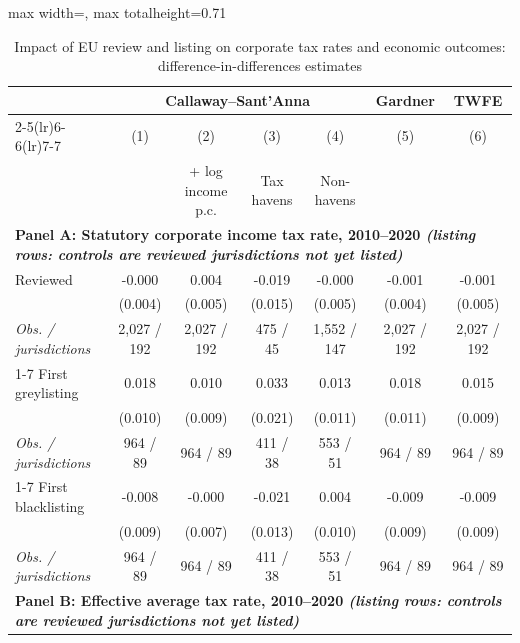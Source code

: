 \begin{table}[p]
\centering
\caption{Impact of EU review and listing on corporate tax rates and economic outcomes: difference-in-differences estimates\label{t:didextended}}
{\scriptsize\setlength{\heavyrulewidth}{1.5pt}\setlength{\lightrulewidth}{1pt}\setlength{\cmidrulewidth}{0.5pt}%
\renewcommand{\arraystretch}{1.1}%
\begin{adjustbox}{max width=\textwidth, max totalheight=0.71\textheight}
\begin{tabular}{l*{6}{c}}
\toprule
 & \multicolumn{4}{c}{Callaway--Sant'Anna} & Gardner & TWFE \\
\cmidrule(lr){2-5}\cmidrule(lr){6-6}\cmidrule(lr){7-7}
 & (1) & (2) & (3) & (4) & (5) & (6) \\
 & & + log income p.c. & Tax havens & Non-havens & & \\
\midrule
\multicolumn{7}{l}{\textbf{Panel A: Statutory corporate income tax rate, 2010--2020 \normalfont\emph{(listing rows: controls are reviewed jurisdictions not yet listed)}}} \\[2pt]
Reviewed & -0.000 & 0.004 & -0.019 & -0.000 & -0.001 & -0.001 \\
 & (0.004) & (0.005) & (0.015) & (0.005) & (0.004) & (0.005) \\
\hspace{1em}\textit{Obs. / jurisdictions} & 2,027 / 192 & 2,027 / 192 & 475 / 45 & 1,552 / 147 & 2,027 / 192 & 2,027 / 192 \\
\cmidrule(lr){1-7}
First greylisting & 0.018\sym{*} & 0.010 & 0.033 & 0.013 & 0.018\sym{*} & 0.015 \\
 & (0.010) & (0.009) & (0.021) & (0.011) & (0.011) & (0.009) \\
\hspace{1em}\textit{Obs. / jurisdictions} & 964 / 89 & 964 / 89 & 411 / 38 & 553 / 51 & 964 / 89 & 964 / 89 \\
\cmidrule(lr){1-7}
First blacklisting & -0.008 & -0.000 & -0.021 & 0.004 & -0.009 & -0.009 \\
 & (0.009) & (0.007) & (0.013) & (0.010) & (0.009) & (0.009) \\
\hspace{1em}\textit{Obs. / jurisdictions} & 964 / 89 & 964 / 89 & 411 / 38 & 553 / 51 & 964 / 89 & 964 / 89 \\
\midrule
\multicolumn{7}{l}{\textbf{Panel B: Effective average tax rate, 2010--2020 \normalfont\emph{(listing rows: controls are reviewed jurisdictions not yet listed)}}} \\[2pt]

\end{tabular}
\end{adjustbox}}
\end{table}

